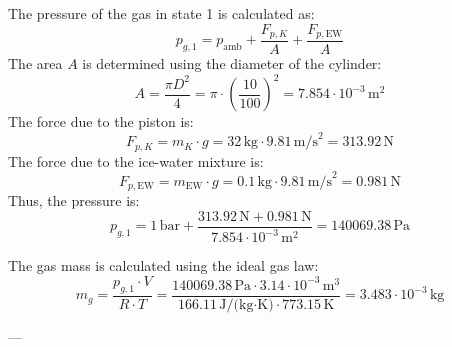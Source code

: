The pressure of the gas in state 1 is calculated as:  
\[
p_{g,1} = p_{\text{amb}} + \frac{F_{p,K}}{A} + \frac{F_{p,\text{EW}}}{A}
\]  
The area \( A \) is determined using the diameter of the cylinder:  
\[
A = \frac{\pi D^2}{4} = \pi \cdot \left(\frac{10}{100}\right)^2 = 7.854 \cdot 10^{-3} \, \text{m}^2
\]  
The force due to the piston is:  
\[
F_{p,K} = m_K \cdot g = 32 \, \text{kg} \cdot 9.81 \, \text{m/s}^2 = 313.92 \, \text{N}
\]  
The force due to the ice-water mixture is:  
\[
F_{p,\text{EW}} = m_{\text{EW}} \cdot g = 0.1 \, \text{kg} \cdot 9.81 \, \text{m/s}^2 = 0.981 \, \text{N}
\]  
Thus, the pressure is:  
\[
p_{g,1} = 1 \, \text{bar} + \frac{313.92 \, \text{N} + 0.981 \, \text{N}}{7.854 \cdot 10^{-3} \, \text{m}^2} = 140069.38 \, \text{Pa}
\]  

The gas mass is calculated using the ideal gas law:  
\[
m_g = \frac{p_{g,1} \cdot V}{R \cdot T} = \frac{140069.38 \, \text{Pa} \cdot 3.14 \cdot 10^{-3} \, \text{m}^3}{166.11 \, \text{J/(kg·K)} \cdot 773.15 \, \text{K}} = 3.483 \cdot 10^{-3} \, \text{kg}
\]  

---